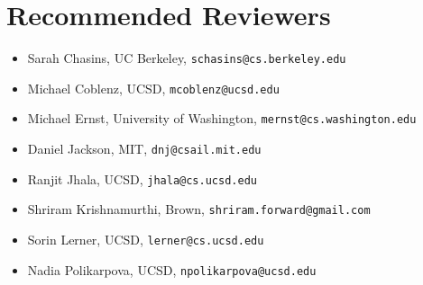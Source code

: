 \section*{Recommended Reviewers}

\begin{itemize}
  \item Sarah Chasins, UC Berkeley, \texttt{schasins@cs.berkeley.edu}
  \item Michael Coblenz, UCSD, \texttt{mcoblenz@ucsd.edu}
  \item Michael Ernst, University of Washington,
        \texttt{mernst@cs.washington.edu} 
  \item Daniel Jackson, MIT, \texttt{dnj@csail.mit.edu}
  \item Ranjit Jhala, UCSD, \texttt{jhala@cs.ucsd.edu}
  \item Shriram Krishnamurthi, Brown, \texttt{shriram.forward@gmail.com}
  \item Sorin Lerner, UCSD, \texttt{lerner@cs.ucsd.edu}
  \item Nadia Polikarpova, UCSD, \texttt{npolikarpova@ucsd.edu}
\end{itemize}

